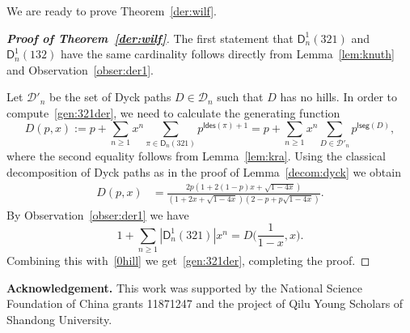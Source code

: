 \documentclass[12pt]{amsart}
\numberwithin{equation}{section}
\theoremstyle{plain}
\theoremstyle{definition}
\newcommand\D{\mathsf{D}}
\def\lseg{\mathsf{lseg}}
\def\ldes{\mathsf{ldes}}
\begin{document}
We are ready to prove Theorem~\ref{der:wilf}.

\begin{proof}[{\bf Proof of Theorem~\ref{der:wilf}}] The first statement  that $\D_n^1(321)$ and $\D_n^1(132)$ have the same cardinality follows directly from Lemma~\ref{lem:knuth} and Observation~\ref{obser:der1}. 












Let $\mathcal{D}'_n$ be the set of Dyck paths $D\in\mathcal{D}_n$ such that $D$ has no hills.  In order to compute~\eqref{gen:321der}, we need to calculate the generating function
$$
D(p,x):=p+\sum_{n\geq1}x^n\sum_{\pi\in\D_n(321)}p^{\ldes(\pi)+1}=p+\sum_{n\geq1}x^n\sum_{D\in\mathcal{D}'_n}p^{\lseg(D)},
$$
where the second equality follows from Lemma~\ref{lem:kra}. Using the classical decomposition of Dyck paths as in the proof of Lemma~\ref{decom:dyck} we obtain
\begin{align}\label{0hill}

D(p,x) &= \frac{2p(1+2(1-p)x+\sqrt{1-4x})}{(1+2x+\sqrt{1-4x})(2-p+p\sqrt{1-4x})}.
\end{align}
By Observation~\ref{obser:der1} we have 
$$
 1+\sum_{n\geq1}|\D_n^1(321)|x^n=D\bigl(\frac{1}{1-x},x\bigr). 
$$
Combining this with~\eqref{0hill} we get~\eqref{gen:321der}, completing the proof. 
\end{proof}

\noindent
{\bf Acknowledgement.}
This work was supported
by the National Science Foundation of China grants 11871247 and  the project of Qilu Young Scholars of Shandong University.

\bigskip
\bigskip


\end{document}
